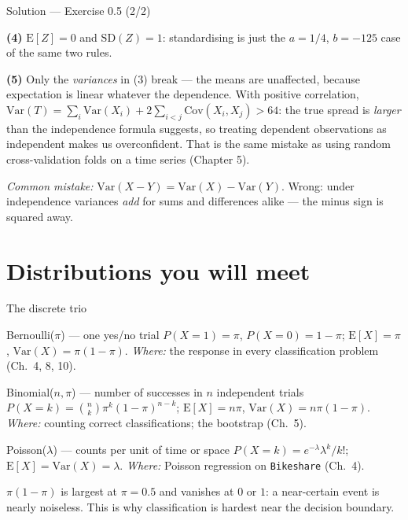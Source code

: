 \documentclass[aspectratio=169,11pt]{beamer}
\begin{document}
\begin{frame}{Solution --- Exercise 0.5 (2/2)}
  \begin{solutionbox}
    \textbf{(4)} $\mathrm{E}[Z] = 0$ and $\mathrm{SD}(Z) = 1$: standardising
    is just the $a = 1/4$, $b = -125$ case of the same two rules.

    \textbf{(5)} Only the \emph{variances} in (3) break --- the means are
    unaffected, because expectation is linear whatever the dependence. With
    positive correlation, $\mathrm{Var}(T) = \sum_i\mathrm{Var}(X_i) +
    2\sum_{i<j}\mathrm{Cov}(X_i,X_j) > 64$: the true spread is \emph{larger}
    than the independence formula suggests, so treating dependent
    observations as independent makes us overconfident. That is the same
    mistake as using random cross-validation folds on a time series
    (Chapter 5).

    \textit{Common mistake:} $\mathrm{Var}(X-Y) = \mathrm{Var}(X) -
    \mathrm{Var}(Y)$. Wrong: under independence variances \emph{add} for
    sums and differences alike --- the minus sign is squared away.
  \end{solutionbox}
\end{frame}


\section[Distributions]{Distributions you will meet}

\begin{frame}{The discrete trio}
  \footnotesize
  \begin{block}{Bernoulli($\pi$) --- one yes/no trial}
    $P(X=1) = \pi$, $P(X=0) = 1-\pi$; $\mathrm{E}[X] = \pi$,
    $\mathrm{Var}(X) = \pi(1-\pi)$.
    \emph{Where:} the response in every classification problem
    (Ch.\ 4, 8, 10).
  \end{block}
  \begin{block}{Binomial($n,\pi$) --- number of successes in $n$ independent trials}
    $P(X=k) = \binom{n}{k}\pi^k(1-\pi)^{n-k}$; $\mathrm{E}[X] = n\pi$,
    $\mathrm{Var}(X) = n\pi(1-\pi)$.
    \emph{Where:} counting correct classifications; the bootstrap
    (Ch.\ 5).
  \end{block}
  \begin{block}{Poisson($\lambda$) --- counts per unit of time or space}
    $P(X=k) = e^{-\lambda}\lambda^k / k!$; $\mathrm{E}[X] = \mathrm{Var}(X) = \lambda$.
    \emph{Where:} Poisson regression on \texttt{Bikeshare} (Ch.\ 4).
  \end{block}
  \begin{takeaway}
    $\pi(1-\pi)$ is largest at $\pi = 0.5$ and vanishes at $0$ or $1$: a
    near-certain event is nearly noiseless. This is why classification is
    hardest near the decision boundary.
  \end{takeaway}
\end{frame}
\end{document}
